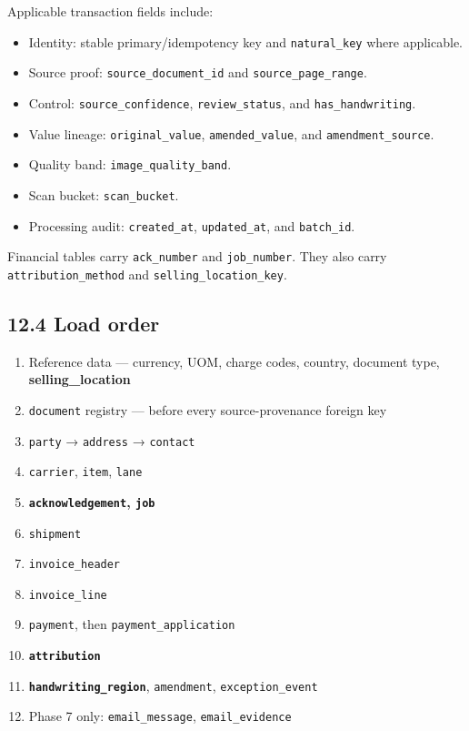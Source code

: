 \documentclass[
]{article}
\providecommand{\tightlist}{%
  \setlength{\itemsep}{0pt}\setlength{\parskip}{0pt}}
\begin{document}
Applicable transaction fields include:

\begin{itemize}
\tightlist
\item
  Identity: stable primary/idempotency key and
  \texttt{natural\_\allowbreak{}key} where applicable.
\item
  Source proof: \texttt{source\_\allowbreak{}document\_\allowbreak{}id}
  and \texttt{source\_\allowbreak{}page\_\allowbreak{}range}.
\item
  Control: \texttt{source\_\allowbreak{}confidence},
  \texttt{review\_\allowbreak{}status}, and
  \texttt{has\_\allowbreak{}handwriting}.
\item
  Value lineage: \texttt{original\_\allowbreak{}value},
  \texttt{amended\_\allowbreak{}value}, and
  \texttt{amendment\_\allowbreak{}source}.
\item
  Quality band: \texttt{image\_\allowbreak{}quality\_\allowbreak{}band}.
\item
  Scan bucket: \texttt{scan\_\allowbreak{}bucket}.
\item
  Processing audit: \texttt{created\_\allowbreak{}at},
  \texttt{updated\_\allowbreak{}at}, and
  \texttt{batch\_\allowbreak{}id}.
\end{itemize}

Financial tables carry \texttt{ack\_\allowbreak{}number} and
\texttt{job\_\allowbreak{}number}. They also carry
\texttt{attribution\_\allowbreak{}method} and
\texttt{selling\_\allowbreak{}location\_\allowbreak{}key}.

\subsection{12.4 Load order}\label{load-order}

\begin{enumerate}
\def\labelenumi{\arabic{enumi}.}
\tightlist
\item
  Reference data --- currency, UOM, charge codes, country, document
  type, \textbf{selling\_location}
\item
  \texttt{document} registry --- before every source-provenance foreign
  key
\item
  \texttt{party} → \texttt{address} → \texttt{contact}
\item
  \texttt{carrier}, \texttt{item}, \texttt{lane}
\item
  \textbf{\texttt{acknowledgement}, \texttt{job}}
\item
  \texttt{shipment}
\item
  \texttt{invoice\_\allowbreak{}header}
\item
  \texttt{invoice\_\allowbreak{}line}
\item
  \texttt{payment}, then \texttt{payment\_\allowbreak{}application}
\item
  \textbf{\texttt{attribution}}
\item
  \textbf{\texttt{handwriting\_\allowbreak{}region}},
  \texttt{amendment}, \texttt{exception\_\allowbreak{}event}
\item
  Phase 7 only: \texttt{email\_\allowbreak{}message},
  \texttt{email\_\allowbreak{}evidence}
\end{enumerate}
\end{document}
